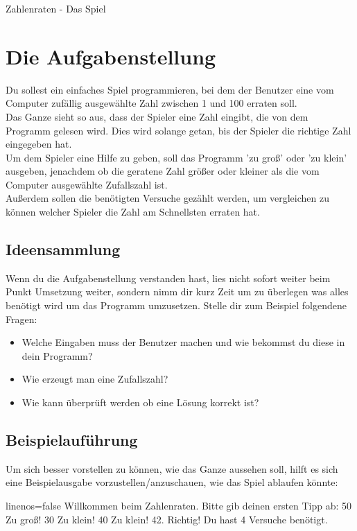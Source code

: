 \documentclass{\VorlagenPfad/coderdojokatext}
\newcommand{\Titel}{Zahlenraten - Das Spiel}
\begin{document}
\setcounter{chapter}{1}

\begin{center}
	{\huge \Titel}
\end{center}

\section{Die Aufgabenstellung} Du sollest ein einfaches Spiel programmieren, bei dem der Benutzer eine vom Computer zufällig ausgewählte Zahl zwischen 1 und 100 erraten soll.
\\Das Ganze sieht so aus, dass der Spieler eine Zahl eingibt, die von dem Programm gelesen wird. Dies wird solange getan, bis der Spieler die richtige Zahl eingegeben hat.
\\
Um dem Spieler eine Hilfe zu geben, soll das Programm 'zu groß' oder 'zu klein' ausgeben, jenachdem ob die geratene Zahl größer oder kleiner als die vom Computer ausgewählte Zufallszahl ist.
\\Außerdem sollen die benötigten Versuche gezählt werden, um vergleichen zu können welcher Spieler die Zahl am Schnellsten erraten hat.

\subsection{Ideensammlung} Wenn du die Aufgabenstellung verstanden hast, lies nicht sofort weiter beim Punkt Umsetzung weiter, sondern nimm dir kurz Zeit um zu überlegen was alles benötigt wird um das Programm umzusetzen. Stelle dir zum Beispiel folgendene Fragen:
\begin{itemize}
	\item Welche Eingaben muss der Benutzer machen und wie bekommst du diese in dein Programm?
	\item Wie erzeugt man eine Zufallszahl?
	\item Wie kann überprüft werden ob eine Lösung korrekt ist?
\end{itemize}

\subsection{Beispielauführung} Um sich besser vorstellen zu können, wie das Ganze aussehen soll, hilft es sich eine Beispielausgabe vorzustellen/anzuschauen, wie das Spiel ablaufen könnte:

\begin{pseudocode*}{linenos=false}
Willkommen beim Zahlenraten. Bitte gib deinen ersten Tipp ab:
50
Zu groß!
30
Zu klein!
40
Zu klein!
42.
Richtig! Du hast 4 Versuche benötigt.
\end{pseudocode*}
\end{document}
